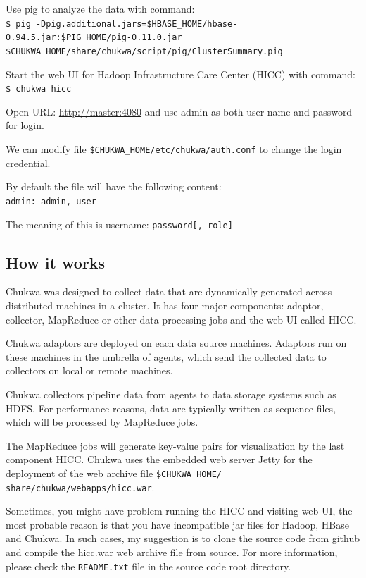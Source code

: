 Use pig to analyze the data with command: \\
\verb|$ pig -Dpig.additional.jars=$HBASE_HOME/hbase-0.94.5.jar:$PIG_HOME/pig-0.11.0.jar $CHUKWA_HOME/share/chukwa/script/pig/ClusterSummary.pig |

Start the web UI for Hadoop Infrastructure Care Center (HICC) with command: \\
\verb|$ chukwa hicc|

Open URL: \url{http://master:4080} and use admin as both user name and password for login.

We can modify file \verb|$CHUKWA_HOME/etc/chukwa/auth.conf| to change the login credential.

By default the file will have the following content:\\
\verb|admin: admin, user|

The meaning of this is username: \verb|password[, role]|

\subsection*{How it works}
Chukwa was designed to collect data that are dynamically generated across distributed machines in a cluster. It has four major components: adaptor, collector, MapReduce or other data processing jobs and the web UI called HICC.

Chukwa adaptors are deployed on each data source machines. Adaptors run on these machines in the umbrella of agents, which send the collected data to collectors on local or remote machines.

Chukwa collectors pipeline data from agents to data storage systems such as HDFS. For performance reasons, data are typically written as sequence files, which will be processed by MapReduce jobs.

The MapReduce jobs will generate key-value pairs for visualization by the last component HICC. Chukwa uses the embedded web server Jetty for the deployment of the web archive file \verb|$CHUKWA_HOME/ share/chukwa/webapps/hicc.war|.

Sometimes, you might have problem running the HICC and visiting web UI, the most probable reason is that you have incompatible jar files for Hadoop, HBase and Chukwa. In such cases, my suggestion is to clone the source code from \href{https://github.com/apache/chukwa}{github} and compile the hicc.war web archive file from source. For more information, please check the \verb|README.txt| file in the source code root directory.

